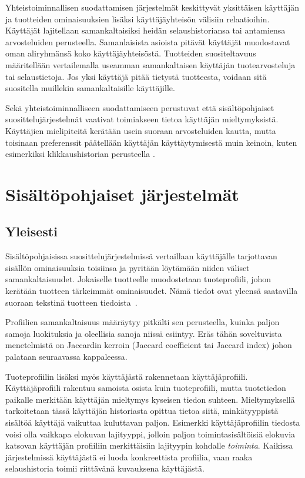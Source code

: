 \documentclass[12pt,finnish]{tktltiki2}
\theoremstyle{definition}
\theoremstyle{remark}
\begin{document}
        Yhteistoiminnallisen suodattamisen järjestelmät keskittyvät yksittäisen käyttäjän ja tuotteiden ominaisuuksien lisäksi käyttäjäyhteisön välisiin relaatioihin. Käyttäjät lajitellaan samankaltaisiksi heidän selaushistoriansa tai antamiensa arvosteluiden perusteella. Samanlaisista asioista pitävät käyttäjät muodostavat oman aliryhmänsä koko käyttäjäyhteisöstä. Tuotteiden suositeltavuus määritellään vertailemalla useamman samankaltaisen käyttäjän tuotearvosteluja tai selaustietoja. Jos yksi käyttäjä pitää tietystä tuotteesta, voidaan sitä suositella muillekin samankaltaisille käyttäjille.
        
        Sekä yhteistoiminnalliseen suodattamiseen perustuvat että sisältöpohjaiset suosittelujärjestelmät vaativat toimiakseen tietoa käyttäjän mieltymyksistä. Käyttäjien mielipiteitä kerätään usein suoraan arvosteluiden kautta, mutta toisinaan preferenssit päätellään käyttäjän käyttäytymisestä muin keinoin, kuten esimerkiksi klikkaushistorian perusteella \cite{Das:2007:GNP:1242572.1242610}.
        
\section{Sisältöpohjaiset järjestelmät}
        
\subsection{Yleisesti}

Sisältöpohjaisissa suosittelujärjestelmissä vertaillaan käyttäjälle tarjottavan sisällön ominaisuuksia toisiinsa ja pyritään löytämään niiden väliset samankaltaisuudet.
Jokaiselle tuotteelle muodostetaan tuoteprofiili, johon kerätään tuotteen tärkeimmät ominaisuudet. Nämä tiedot ovat yleensä saatavilla suoraan tekstinä tuotteen tiedoista~\cite{Ullman}.

Profiilien samankaltaisuus määräytyy pitkälti sen perusteella, kuinka paljon samoja luokituksia ja oleellisia sanoja niissä esiintyy. Eräs tähän soveltuvista menetelmistä on Jaccardin kerroin (Jaccard coefficient tai Jaccard index) johon palataan seuraavassa kappaleessa.

Tuoteprofiilin lisäksi myös käyttäjästä rakennetaan käyttäjäprofiili. Käyttäjäprofiili rakentuu samoista osista kuin tuoteprofiili, mutta tuotetiedon paikalle merkitään käyttäjän mieltymys kyseisen tiedon suhteen. Mieltymyksellä tarkoitetaan tässä käyttäjän historiasta opittua tietoa siitä, minkätyyppistä sisältöä käyttäjä vaikuttaa kuluttavan paljon. Esimerkki käyttäjäprofiilin tiedosta voisi olla vaikkapa elokuvan lajityyppi, jolloin paljon toimintasisältöisiä elokuvia katsovan käyttäjän profiiliin merkittäisiin lajityypin kohdalle \textit{toiminta}. Kaikissa järjestelmissä käyttäjästä ei luoda konkreettista profiilia, vaan raaka selaushistoria toimii riittävänä kuvauksena käyttäjästä.
\end{document}
